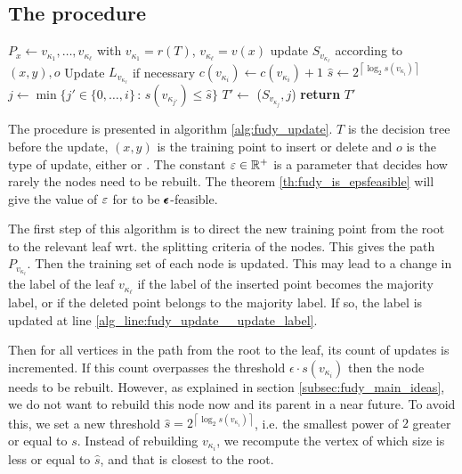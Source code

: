 \subsection{The \AlgoUpdate{} procedure}

\begin{algorithm}
\caption{\algo{}.\AlgoUpdate{}} \label{alg:fudy_update}
\begin{algorithmic}[1]
\State $P_{x} \gets v_{\kappa_1},\dots, v_{\kappa_\ell}$ with  $v_{\kappa_1}=r(T)$, $v_{\kappa_\ell}=v(x)$ \label{alg_line:fudy_update__get_path}
\State update $S_{v_{\kappa_\ell}}$ according to $(x,y),o$ \label{alg_line:fudy_update__update_dataset}
\State Update $L_{v_{\kappa_\ell}}$ if necessary \label{alg_line:fudy_update__update_label}
\State $c({v_{\kappa_i}}) \gets c(v_{\kappa_i})+1$
\label{alg_line:fudy_update__if_need_to_recompute}
\State $\hat{s} \gets 2^{\left\lceil \log_2 s ( v_{\kappa_i})  \right\rceil }$ \label{alg_line:fudy_update__recompute_thresh}
\State $j \gets \min \{ j' \in \{0,\ldots,i\} \,:\, s(v_{\kappa_{j'}}) \leq \hat{s} \}$ \label{alg_line:fudy_update__min_vert_recompute}
\State $T' \gets$ \AlgoBuild{}($S_{v_{\kappa_j}},j$)
\State \textbf{return} $T'$
\EndIf
\EndFor
\EndProcedure
\end{algorithmic}
\end{algorithm}

The \AlgoUpdate{} procedure is presented in algorithm \ref{alg:fudy_update}. $T$ is the decision tree before the update, $(x,y)$ is the training point to insert or delete and $o$ is the type of update, either \ins{} or \del{}. The constant $\varepsilon \in \mathbb{R}^+$ is a parameter that decides how rarely the nodes need to be rebuilt. The theorem \ref{th:fudy_is_epsfeasible} will give the value of $\varepsilon$ for \algo{} to be $\pmb{\epsilon}$-feasible.

The first step of this algorithm is to direct the new training point from the root to the relevant leaf wrt. the splitting criteria of the nodes. This gives the path $P_{v_{\kappa_\ell}}$. Then the training set of each node is updated. This may lead to a change in the label of the leaf $v_{\kappa_\ell}$ if the label of the inserted point becomes the majority label, or if the deleted point belongs to the majority label. If so, the label is updated at line \ref{alg_line:fudy_update__update_label}.

Then for all vertices in the path from the root to the leaf, its count of updates is incremented. If this count overpasses the threshold $\epsilon \cdot s ( v_{\kappa_i})$ then the node needs to be rebuilt. However, as explained in section \ref{subsec:fudy_main_ideas}, we do not want to rebuild this node now and its parent in a near future. To avoid this, we set a new threshold $\hat{s} = 2^{\left\lceil \log_2 s ( v_{\kappa_i})  \right\rceil }$, i.e. the smallest power of $2$ greater or equal to $s$. Instead of rebuilding $v_{\kappa_i}$, we recompute the vertex of which size is less or equal to $\hat{s}$, and that is closest to the root.

